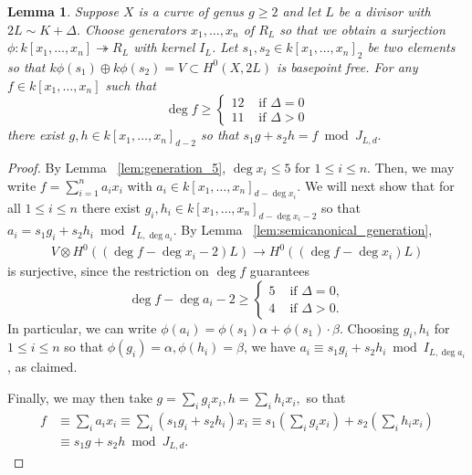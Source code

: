 \documentclass{amsart}
\theoremstyle{plain}
\newtheorem{lem}[thm]{Lemma}
\theoremstyle{definition}
\theoremstyle{remark}
\numberwithin{equation}{section}
\begin{document}
\begin{lem}
\label{lem:reducing_degree}
Suppose $X$ is a curve of genus $g \geq 2$ and let $L$ be a divisor with $2L \sim K+\Delta$. Choose generators $x_1, \ldots, x_n$ of $R_L$ so that we obtain a surjection $\phi:k[x_1, \ldots, x_n] \twoheadrightarrow R_L$ with kernel $I_L$. Let $s_1,s_2 \in k[x_1, \ldots, x_n]_2$ be two elements so that $k\phi(s_1) \oplus k\phi(s_2) = V \subset H^0(X,2L)$ is basepoint free.
For any $f \in k[x_1, \ldots, x_n]$ such that
$$
\deg f \geq \begin{cases}
	12 &\text{ if }\Delta = 0\\
	11 &\text{ if }\Delta > 0
\end{cases}$$
there exist $g,h \in k[x_1, \ldots, x_n]_{d-2}$ so that $s_1g + s_2h = f \bmod J_{L,d}.$
\end{lem}
\begin{proof}
By Lemma ~\ref{lem:generation_5}, $\deg x_i \leq 5$ for $1 \leq i \leq n$. Then, we may write $f = \sum_{i = 1}^{n}a_i x_i$ with $a_i \in k[x_1, \ldots, x_n]_{d-\deg x_i}$.
We will next show that for all $1 \leq i \leq n$ there exist $g_i, h_i \in k[x_1, \ldots, x_n]_{d - \deg x_i - 2}$ so that $a_i = s_1g_i + s_2h_i \bmod I_{L,\deg a_i}.$ 
By Lemma ~\ref{lem:semicanonical_generation},
\begin{align*}
	V \otimes H^0((\deg f-\deg x_i -2)L) \rightarrow H^0((\deg f-\deg x_i)L)
\end{align*}
is surjective, since the restriction on $\deg f$ guarantees
$$
\deg f- \deg a_i -2 \geq \begin{cases}
	5 &\text{ if }\Delta = 0,\\
	4 &\text{ if }\Delta > 0.
\end{cases}$$
In particular, we can write $\phi(a_i) = \phi(s_1) \alpha + \phi(s_1) \cdot \beta$. Choosing $g_i,h_i$ for $1 \leq i \leq n$ so that $\phi(g_i) = \alpha,\phi(h_i) = \beta$, we have $a_i \equiv s_1 g_i + s_2 h_i \bmod I_{L,\deg a_i}$, as claimed.

Finally, we may then take $g = \sum_{i}^{}g_i x_i,h = \sum_{i}^{}h_i x_i,$ so that 
\begin{align*}
	f &\equiv \sum_{i}^{}a_i x_i \equiv \sum_{i}^{}(s_1g_i + s_2h_i)x_i \equiv s_1 \left( \sum_{i}^{}g_i x_i \right) + s_2 \left( \sum_{i}^{}h_i x_i \right) \\
	&\equiv s_1 g + s_2 h \bmod J_{L,d}.
\end{align*}
\end{proof}
\end{document}

